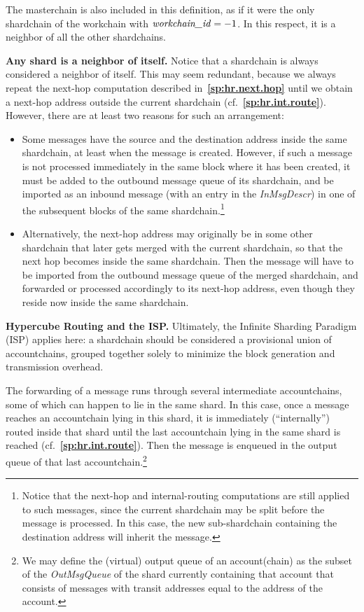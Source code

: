 \documentclass[12pt,oneside]{article}
\def\makepoint#1{\medbreak\noindent{\bf #1.\ }}
\def\nxsubpoint{\refstepcounter{subsubsection}%
  \smallbreak\makepoint{\thesubsubsection}}
\def\refpoint#1{{\rm\textbf{\ref{#1}}}}
\let\ptref=\refpoint
\def\emb#1{\textbf{#1.}}
\let\vr=\textit
\def\workchainid{\vr{workchain\_id\/}}
\begin{document}
The masterchain is also included in this definition, as if it were the only shardchain of the workchain with $\workchainid=-1$. In this respect, it is a neighbor of all the other shardchains.

\nxsubpoint\emb{Any shard is a neighbor of itself}
Notice that a shardchain is always considered a neighbor of itself. This may seem redundant, because we always repeat the next-hop computation described in~\ptref{sp:hr.next.hop} until we obtain a next-hop address outside the current shardchain (cf.~\ptref{sp:hr.int.route}). However, there are at least two reasons for such an arrangement:
\begin{itemize}
\item Some messages have the source and the destination address inside the same shardchain, at least when the message is created. However, if such a message is not processed immediately in the same block where it has been created, it must be added to the outbound message queue of its shardchain, and be imported as an inbound message (with an entry in the {\em InMsgDescr}) in one of the subsequent blocks of the same shardchain.\footnote{Notice that the next-hop and internal-routing computations are still applied to such messages, since the current shardchain may be split before the message is processed. In this case, the new sub-shardchain containing the destination address will inherit the message.}
\item Alternatively, the next-hop address may originally be in some other shardchain that later gets merged with the current shardchain, so that the next hop becomes inside the same shardchain. Then the message will have to be imported from the outbound message queue of the merged shardchain, and forwarded or processed accordingly to its next-hop address, even though they reside now inside the same shardchain.
\end{itemize}

\nxsubpoint\label{sp:isp.hr}\emb{Hypercube Routing and the ISP}
Ultimately, the Infinite Sharding Paradigm (ISP) applies here: a shardchain should be considered a provisional union of accountchains, grouped together solely to minimize the block generation and transmission overhead.

The forwarding of a message runs through several intermediate account\-chains, some of which can happen to lie in the same shard. In this case, once a message reaches an accountchain lying in this shard, it is immediately (``internally'') routed inside that shard until the last accountchain lying in the same shard is reached (cf.~\ptref{sp:hr.int.route}). Then the message is enqueued in the output queue of that last accountchain.\footnote{We may define the (virtual) output queue of an account(chain) as the subset of the {\em OutMsgQueue\/} of the shard currently containing that account that consists of messages with transit addresses equal to the address of the account.}
\end{document}
